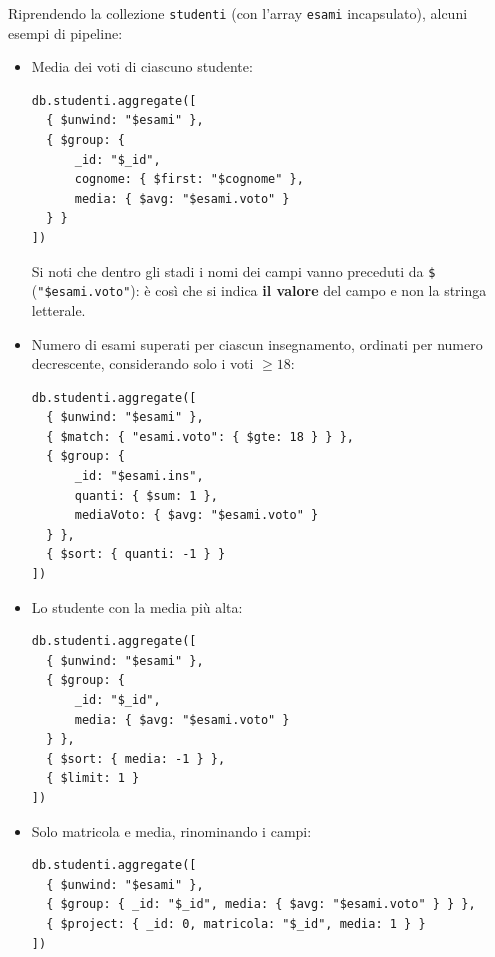 \documentclass[a4paper,twoside]{article}
\begin{document}
\begin{example}
  Riprendendo la collezione \texttt{studenti} (con l'array \texttt{esami} incapsulato),
  alcuni esempi di pipeline:
  \begin{itemize}
    \item Media dei voti di ciascuno studente:
\begin{lstlisting}
db.studenti.aggregate([
  { $unwind: "$esami" },
  { $group: {
      _id: "$_id",
      cognome: { $first: "$cognome" },
      media: { $avg: "$esami.voto" }
  } }
])
\end{lstlisting}
    Si noti che dentro gli stadi i nomi dei campi vanno preceduti da \texttt{\$}
    (\texttt{"\$esami.voto"}): è così che si indica \textbf{il valore} del campo e non
    la stringa letterale.

    \item Numero di esami superati per ciascun insegnamento, ordinati per numero
      decrescente, considerando solo i voti \( \ge 18 \):
\begin{lstlisting}
db.studenti.aggregate([
  { $unwind: "$esami" },
  { $match: { "esami.voto": { $gte: 18 } } },
  { $group: {
      _id: "$esami.ins",
      quanti: { $sum: 1 },
      mediaVoto: { $avg: "$esami.voto" }
  } },
  { $sort: { quanti: -1 } }
])
\end{lstlisting}

    \item Lo studente con la media più alta:
\begin{lstlisting}
db.studenti.aggregate([
  { $unwind: "$esami" },
  { $group: {
      _id: "$_id",
      media: { $avg: "$esami.voto" }
  } },
  { $sort: { media: -1 } },
  { $limit: 1 }
])
\end{lstlisting}

    \item Solo matricola e media, rinominando i campi:
\begin{lstlisting}
db.studenti.aggregate([
  { $unwind: "$esami" },
  { $group: { _id: "$_id", media: { $avg: "$esami.voto" } } },
  { $project: { _id: 0, matricola: "$_id", media: 1 } }
])
\end{lstlisting}
  \end{itemize}
\end{example}
\end{document}
